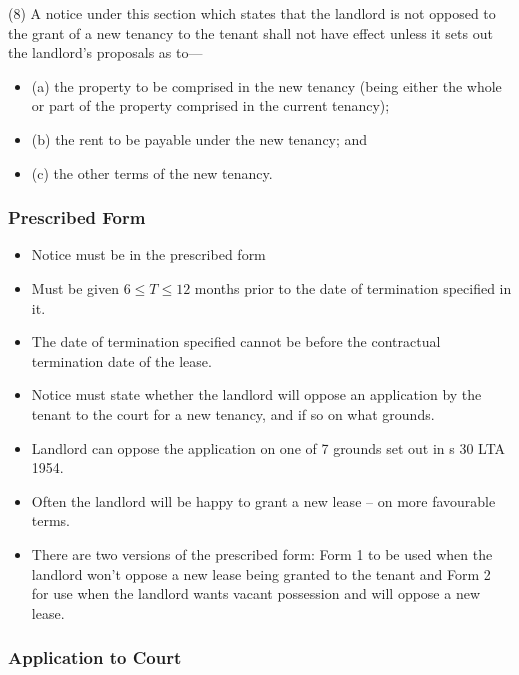 \documentclass[
]{article}
\providecommand{\tightlist}{%
  \setlength{\itemsep}{0pt}\setlength{\parskip}{0pt}}
\newenvironment{env-2aad614f-6fd6-4025-876c-fcdbeae766fb}
{
    \savenotes\tcolorbox[blanker,breakable,left=5pt,borderline west={2pt}{-4pt}{green}]
}
{
    \endtcolorbox\spewnotes
}
\begin{document}
\begin{env-2aad614f-6fd6-4025-876c-fcdbeae766fb}
(8) A notice under this section which states that the landlord is not
opposed to the grant of a new tenancy to the tenant shall not have
effect unless it sets out the landlord's proposals as to---

\begin{itemize}
\tightlist
\item
  (a) the property to be comprised in the new tenancy (being either the
  whole or part of the property comprised in the current tenancy);
\item
  (b) the rent to be payable under the new tenancy; and
\item
  (c) the other terms of the new tenancy.
\end{itemize}

\end{env-2aad614f-6fd6-4025-876c-fcdbeae766fb}

\hypertarget{prescribed-form}{%
\subsubsection{Prescribed Form}\label{prescribed-form}}

\begin{itemize}
\tightlist
\item
  Notice must be in the prescribed form
\item
  Must be given {\(6 \leq T \leq 12\)} months prior to the date of
  termination specified in it.
\item
  The date of termination specified cannot be before the contractual
  termination date of the lease.
\item
  Notice must state whether the landlord will oppose an application by
  the tenant to the court for a new tenancy, and if so on what grounds.
\item
  Landlord can oppose the application on one of 7 grounds set out in s
  30 LTA 1954.
\item
  Often the landlord will be happy to grant a new lease -- on more
  favourable terms.
\item
  There are two versions of the prescribed form: Form 1 to be used when
  the landlord won't oppose a new lease being granted to the tenant and
  Form 2 for use when the landlord wants vacant possession and will
  oppose a new lease.
\end{itemize}

\hypertarget{application-to-court}{%
\subsubsection{Application to Court}\label{application-to-court}}
\end{document}

